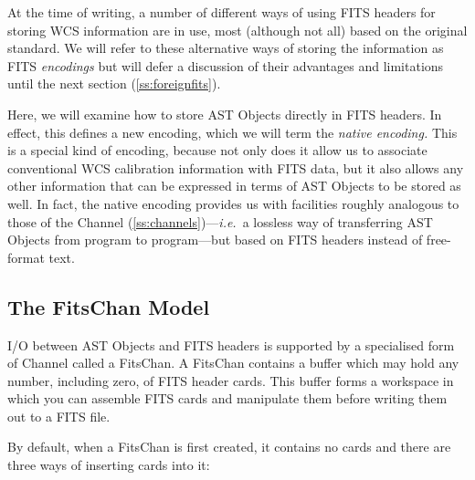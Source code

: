 \documentclass[twoside,11pt]{article}
\newcommand{\secref}[1]{\S\ref{#1}}
\renewcommand{\secref}[1]{\ref{#1}}
\begin{document}
At the time of writing, a number of different ways of using FITS
headers for storing WCS information are in use, most (although not
all) based on the original standard. We will refer to these
alternative ways of storing the information as FITS {\em{encodings}}
but will defer a discussion of their advantages and limitations until
the next section (\secref{ss:foreignfits}).

Here, we will examine how to store AST Objects directly in FITS
headers. In effect, this defines a new encoding, which we will term
the {\em{native encoding.}} This is a special kind of encoding,
because not only does it allow us to associate conventional
WCS calibration information with FITS data, but it also allows any other
information that can be expressed in terms of AST Objects to be stored
as well.  In fact, the native encoding provides us with facilities
roughly analogous to those of the Channel
(\secref{ss:channels})---{\em{i.e.}}\ a lossless way of
transferring AST Objects from program to program---but based on FITS
headers instead of free-format text.

\subsection{The FitsChan Model}

I/O between AST Objects and FITS headers is supported by a specialised
form of Channel called a FitsChan. A FitsChan contains a buffer which
may hold any number, including zero, of FITS header cards. This buffer
forms a workspace in which you can assemble FITS cards and manipulate
them before writing them out to a FITS file.

By default, when a FitsChan is first created, it contains no cards and
there are three ways of inserting cards into it:
\end{document}
